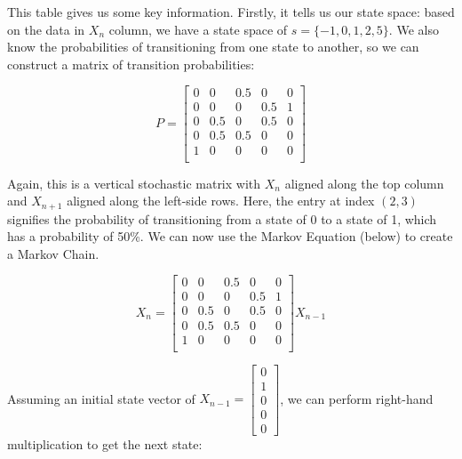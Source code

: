 \documentclass[12pt,final]{article}
\begin{document}
This table gives us some key information. Firstly, it tells us our state space: based on the data in $X_n$
column, we have a state space of $s=\{-1,0,1,2,5\}$. We also know the probabilities of transitioning from
one state to another, so we can construct a matrix of transition probabilities:

\begin{equation}
  P=\begin{bmatrix}
    0 & 0 & 0.5 & 0 & 0 \\
    0 & 0 & 0 & 0.5 & 1 \\
		0 & 0.5 & 0 & 0.5 & 0 \\
		0 & 0.5 & 0.5 & 0 & 0 \\
		1 & 0 & 0 & 0 & 0 \\
  \end{bmatrix}
  \label{eq:transitionprobabilitymatrixchangeinclose}
\end{equation}

Again, this is a vertical stochastic matrix with $X_n$ aligned along the top column and $X_{n+1}$ aligned
along the left-side rows. Here, the entry at index $(2,3)$ signifies the probability of transitioning from
a state of 0 to a state of 1, which has a probability of 50\%. We can now use the Markov Equation (below)
to create a Markov Chain.

\begin{equation}
  X_{n}=\begin{bmatrix}
    0 & 0 & 0.5 & 0 & 0 \\
    0 & 0 & 0 & 0.5 & 1 \\
		0 & 0.5 & 0 & 0.5 & 0 \\
		0 & 0.5 & 0.5 & 0 & 0 \\
		1 & 0 & 0 & 0 & 0 \\
  \end{bmatrix}X_{n-1}
  \label{eq:markovequationchangeinclose}
\end{equation}

Assuming an initial state vector of $X_{n-1}=\begin{bmatrix} 0 \\ 1 \\ 0 \\ 0 \\ 0 \end{bmatrix}$, we can
perform right-hand multiplication to get the next state:
\end{document}

